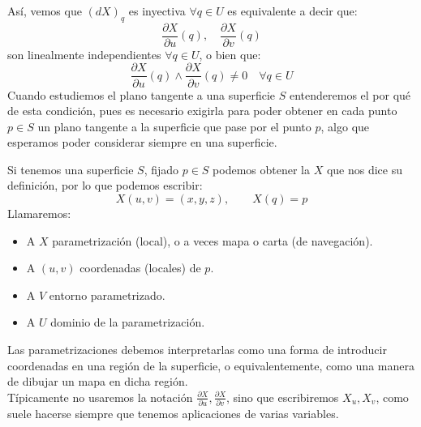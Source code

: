 \begin{observacion}
\begin{enumerate}
\begin{equation*}
            \end{equation*}
            Así, vemos que $(dX)_q$ es inyectiva $\forall q\in U$ es equivalente a decir que:
            \begin{equation*}
                \frac{\partial X}{\partial u}(q),\quad  \frac{\partial X}{\partial v}(q)
            \end{equation*}
            son linealmente independientes $\forall q\in U$, o bien que:
            \begin{equation*}
                \frac{\partial X}{\partial u}(q) \land \frac{\partial X}{\partial v}(q) \neq 0 \quad \forall q\in U
            \end{equation*}
            Cuando estudiemos el plano tangente a una superficie $S$ entenderemos el por qué de esta condición, pues es necesario exigirla para poder obtener en cada punto $p\in S$ un plano tangente a la superficie que pase por el punto $p$, algo que esperamos poder considerar siempre en una superficie.
    \end{enumerate}
\end{observacion}

\begin{notacion}
    Si tenemos una superficie $S$, fijado $p\in S$ podemos obtener la $X$ que nos dice su definición, por lo que podemos escribir:
    \begin{equation*}
        X(u,v) = (x,y,z), \qquad X(q) = p
    \end{equation*}
    Llamaremos:
    \begin{itemize}
        \item A $X$ parametrización (local), o a veces mapa o carta (de navegación).
        \item A $(u,v)$ coordenadas (locales) de $p$.
        \item A $V$ entorno parametrizado.
        \item A $U$ dominio de la parametrización.
    \end{itemize}
    Las parametrizaciones debemos interpretarlas como una forma de introducir coordenadas en una región de la superficie, o equivalentemente, como una manera de dibujar un mapa en dicha región.\\

    \noindent
    Típicamente no usaremos la notación $\frac{\partial X}{\partial u}, \frac{\partial X}{\partial v}$, sino que escribiremos $X_u,X_v$, como suele hacerse siempre que tenemos aplicaciones de varias variables.
\end{notacion}

